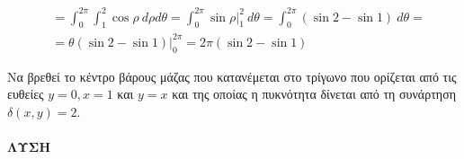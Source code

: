\documentclass[internet]{diag-xelatex}
\newcommand{\lysh}{\textbf{\textcolor{\xrwma}{ΛΥΣΗ}}}
\begin{document}
\begin{thema}[start=2]
\begin{align*}
&=\int_{0}^{2\pi}{\int_{1}^{2}{\cos{\rho}}\ d\rho d\theta}=
\int_{0}^{2\pi}{\left. \sin\rho\right|_{1}^{2}\ d\theta}=\int_{0}^{2\pi}{(\sin 2-\sin 1)\ d\theta}=\\
&=\left. \theta(\sin 2-\sin 1)\right|_{0}^{2\pi}=2\pi(\sin 2-\sin 1)
\end{align*}
\item Να βρεθεί το κέντρο βάρους μάζας που κατανέμεται στο τρίγωνο που ορίζεται από τις ευθείες $ y=0, x=1 $ και $ y=x $ και της οποίας η πυκνότητα δίνεται από τη συνάρτηση $ \delta(x,y)=2 $.\\\\
\lysh\\
\end{thema}
\end{document}
